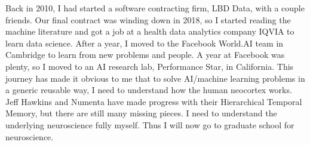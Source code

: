 \documentclass{article}
\begin{document}
Back in 2010, I had started a software contracting firm, LBD Data,
with a couple friends. Our final contract was winding down in 2018, so
I started reading the machine literature and got a job at a health data analytics company IQVIA to learn data science.  After a year, I moved to the Facebook World.AI team in Cambridge to learn from new problems and people. A year at Facebook was plenty, so I moved to an AI research lab, Performance Star, in California. This journey has made it obvious to me that to solve AI/machine learning problems in a generic reusable way, I need to understand how the human neocortex works. Jeff Hawkins and Numenta have made progress with their Hierarchical Temporal Memory, but there are still many missing pieces. I need to understand the underlying neuroscience fully myself. Thus I will now go to graduate school for neuroscience. 
\end{document}
